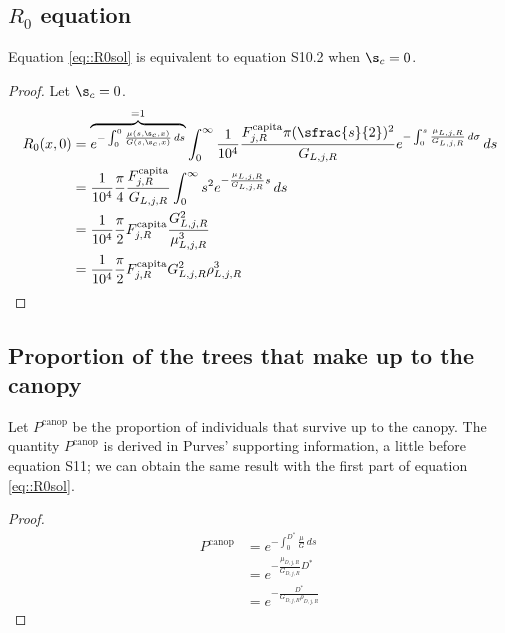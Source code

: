 \begin{refsection}
\subsection{$ R_0 $ equation \citep[p. 1479]{Purves2009}}
Equation \eqref{eq::R0sol} is equivalent to equation S10.2 \citep[also p. 1479 in his article]{Purves2009} when $ \s_c = 0 $.
\begin{proof}
	Let $ \s_c = 0 $.
	\begin{align*}
		R_0 (x, 0) &= \overbrace{e^{-\int_0^{0}\frac{\mu(s, \s_c, x)}{G(s, \s_c, x)} \, ds}}^{= 1} \int_{0}^{\infty} \frac{1}{10^4} \frac{F_{j, R}^{\text{capita}} \pi (\sfrac{s}{2})^2}{G_{L, j, R}} e^{-\int_{0}^{s} \frac{\mu_{L, j, R}}{G_{L, j, R}} \, d\sigma} \, ds \\
			&= \frac{1}{10^4} \frac{\pi}{4} \frac{F_{j, R}^{\text{capita}}}{G_{L, j, R}} \int_{0}^{\infty} s^2 e^{-\frac{\mu_{L, j, R}}{G_{L, j, R}} s} \, ds \\
			&= \frac{1}{10^4} \frac{\pi}{2} F_{j, R}^{\text{capita}} \frac{G_{L, j, R}^2}{\mu_{L, j, R}^3} \\
			&= \frac{1}{10^4} \frac{\pi}{2} F_{j, R}^{\text{capita}} G_{L, j, R}^2 \rho_{L, j, R}^3
	\end{align*}
\end{proof}

\subsection{Proportion of the trees that make up to the canopy}
Let $ P^{\text{canop}} $ be the proportion of individuals that survive up to the canopy. The quantity $ P^{\text{canop}} $ is derived in Purves' supporting information, a little before equation S11; we can obtain the same result with the first part of equation \eqref{eq::R0sol}.
\begin{proof}
	\begin{align*}
		P^{\text{canop}} &= e^{-\int_{0}^{D^{*}} \frac{\mu}{G} \, ds} \\
			&= e^{-\frac{\mu_{D, j, R}}{G_{D, j, R}} D^{*}} \\
			&= e^{-\frac{D^{*}}{G_{D, j, R}\rho_{D, j, R}}}
	\end{align*}
\end{proof}


\end{refsection}
